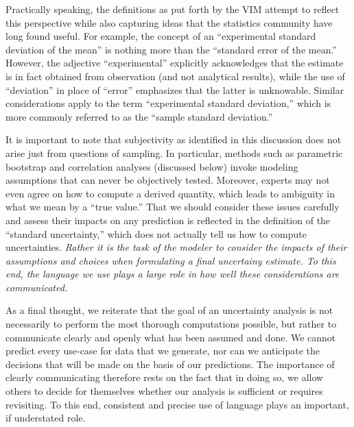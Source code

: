Practically speaking, the definitions as put forth by the VIM attempt to reflect this perspective while also capturing ideas that the statistics community have long found useful.  For example, the concept of an ``experimental standard deviation of the mean'' is nothing more than the ``standard error of the mean.''  However, the adjective ``experimental'' explicitly acknowledges that the estimate is in fact obtained from observation (and not analytical results), while the use of ``deviation'' in place of ``error'' emphasizes that the latter is unknowable.  Similar considerations apply to the term ``experimental standard deviation,'' which is more commonly referred to as the ``sample standard deviation.''

It is important to note that subjectivity as identified in this discussion does not arise just from questions of sampling. In particular, methods such as parametric bootstrap and correlation analyses (discussed below) invoke modeling assumptions that can never be objectively tested.  Moreover, experts may not even agree on how to compute a derived quantity, which leads to ambiguity in what we mean by a ``true value.''\cite{patrone1}  That we should consider these issues carefully and assess their impacts on any prediction is reflected in the definition of the ``standard uncertainty,'' which does not actually tell us how to compute uncertainties.  {\it Rather it is the task of the modeler to consider the impacts of their assumptions and choices when formulating a final uncertainy estimate.  To this end, the language we use plays a large role in how well these considerations are communicated.}

As a final thought, we reiterate that the goal of an uncertainty analysis is not necessarily to perform the most thorough computations possible, but rather to communicate clearly and openly what has been assumed and done.  We cannot predict every use-case for data that we generate, nor can we anticipate the decisions that will be made on the basis of our predictions.  The importance of clearly communicating therefore rests on the fact that in doing so, we allow others to decide for themselves whether our analysis is sufficient or requires revisiting.  To this end, consistent and precise use of language plays an important, if understated role.




